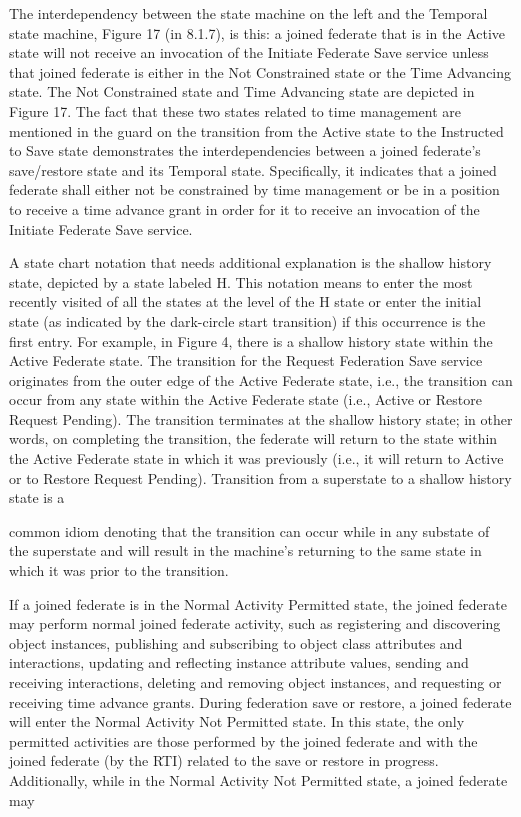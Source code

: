 \vspace*{0.20in}

The interdependency between the state machine on the left and the Temporal state machine, Figure 17 (in 8.1.7), is this: a joined federate that is in the Active state will not receive an invocation of the Initiate Federate Save \rtiinitiated{} service unless that joined federate is either in the Not Constrained state or the Time Advancing state. The Not Constrained state and Time Advancing state are depicted in Figure 17. The fact that these two states related to time management are mentioned in the guard on the transition from the Active state to the Instructed to Save state demonstrates the interdependencies between a joined federate's save/restore state and its Temporal state. Specifically, it indicates that a joined federate shall either not be constrained by time management or be in a position to receive a time advance grant in order for it to receive an invocation of the Initiate Federate Save \rtiinitiated{} service.

A state chart notation that needs additional explanation is the shallow history state, depicted by a state labeled H. This notation means to enter the most recently visited of all the states at the level of the H state or enter the initial state (as indicated by the dark-circle start transition) if this occurrence is the first entry. For example, in Figure 4, there is a shallow history state within the Active Federate state. The transition for the Request Federation Save service originates from the outer edge of the Active Federate state, i.e., the transition can occur from any state within the Active Federate state (i.e., Active or Restore Request Pending). The transition terminates at the shallow history state; in other words, on completing the transition, the federate will return to the state within the Active Federate state in which it was previously (i.e., it will return to Active or to Restore Request Pending). Transition from a superstate to a shallow history state is a

\clearpage

common idiom denoting that the transition can occur while in any substate of the superstate and will result in the machine's returning to the same state in which it was prior to the transition.

If a joined federate is in the Normal Activity Permitted state, the joined federate may perform normal joined federate activity, such as registering and discovering object instances, publishing and subscribing to object class attributes and interactions, updating and reflecting instance attribute values, sending and receiving interactions, deleting and removing object instances, and requesting or receiving time advance grants. During federation save or restore, a joined federate will enter the Normal Activity Not Permitted state. In this state, the only permitted activities are those performed by the joined federate and with the joined federate (by the RTI) related to the save or restore in progress. Additionally, while in the Normal Activity Not Permitted state, a joined federate may

